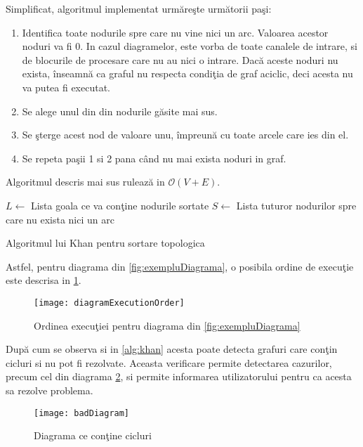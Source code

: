 Simplificat, algoritmul implementat urmăreşte următorii paşi:
\begin{enumerate}
	\item Identifica toate nodurile spre care nu vine nici un arc. Valoarea acestor noduri va fi $0$. In cazul diagramelor, este vorba de toate canalele de intrare, si de blocurile de procesare care nu au nici o intrare. Dacă aceste noduri nu exista, înseamnă ca graful nu respecta condiţia de graf aciclic, deci acesta nu va putea fi executat.
	\item Se alege unul din din nodurile găsite mai sus.
	\item Se şterge acest nod de valoare unu, împreună cu toate arcele care ies din el.
	\item Se repeta paşii 1 si 2 pana când nu mai exista noduri in graf.
\end{enumerate}
Algoritmul descris mai sus rulează in $\mathcal{O}(V + E)$. 

\begin{algorithm}[H]
	$L \gets$ Lista goala ce va conţine nodurile sortate \;
	$S \gets$ Lista tuturor nodurilor spre care nu exista nici un arc \;
	{}{
	{}
}
\label{alg:khan}
\caption{Algoritmul lui Khan pentru sortare topologica}
\end{algorithm}

Astfel, pentru diagrama din \cref{fig:exempluDiagrama}, o posibila ordine de execuţie este descrisa in \cref{fig:executionOrder}.
\begin{figure}[H]
	\centering
	\texttt{[image: diagramExecutionOrder]}
	\caption{Ordinea execuţiei pentru diagrama din \cref{fig:exempluDiagrama}}
	\label{fig:executionOrder}
\end{figure}
După cum se observa si in \cref{alg:khan} acesta poate detecta grafuri care conţin cicluri si nu pot fi rezolvate. Aceasta verificare permite detectarea cazurilor, precum cel din diagrama \ref{fig:badDiagram}, si permite informarea utilizatorului pentru ca acesta sa rezolve problema.
\begin{figure}[H]
	\centering
	\texttt{[image: badDiagram]}
	\caption{Diagrama ce conţine cicluri}
	\label{fig:badDiagram}
\end{figure}

